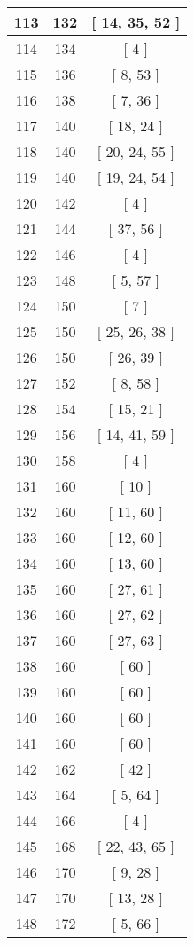 \begin{center}
\begin{longtable}[H]{|| c c c ||}
\\\hline
113 & 132 & [ 14, 35, 52 ]
\\\hline
114 & 134 & [ 4 ]
\\\hline
115 & 136 & [ 8, 53 ]
\\\hline
116 & 138 & [ 7, 36 ]
\\\hline
117 & 140 & [ 18, 24 ]
\\\hline
118 & 140 & [ 20, 24, 55 ]
\\\hline
119 & 140 & [ 19, 24, 54 ]
\\\hline
120 & 142 & [ 4 ]
\\\hline
121 & 144 & [ 37, 56 ]
\\\hline
122 & 146 & [ 4 ]
\\\hline
123 & 148 & [ 5, 57 ]
\\\hline
124 & 150 & [ 7 ]
\\\hline
125 & 150 & [ 25, 26, 38 ]
\\\hline
126 & 150 & [ 26, 39 ]
\\\hline
127 & 152 & [ 8, 58 ]
\\\hline
128 & 154 & [ 15, 21 ]
\\\hline
129 & 156 & [ 14, 41, 59 ]
\\\hline
130 & 158 & [ 4 ]
\\\hline
131 & 160 & [ 10 ]
\\\hline
132 & 160 & [ 11, 60 ]
\\\hline
133 & 160 & [ 12, 60 ]
\\\hline
134 & 160 & [ 13, 60 ]
\\\hline
135 & 160 & [ 27, 61 ]
\\\hline
136 & 160 & [ 27, 62 ]
\\\hline
137 & 160 & [ 27, 63 ]
\\\hline
138 & 160 & [ 60 ]
\\\hline
139 & 160 & [ 60 ]
\\\hline
140 & 160 & [ 60 ]
\\\hline
141 & 160 & [ 60 ]
\\\hline
142 & 162 & [ 42 ]
\\\hline
143 & 164 & [ 5, 64 ]
\\\hline
144 & 166 & [ 4 ]
\\\hline
145 & 168 & [ 22, 43, 65 ]
\\\hline
146 & 170 & [ 9, 28 ]
\\\hline
147 & 170 & [ 13, 28 ]
\\\hline
148 & 172 & [ 5, 66 ]
\\\hline

\end{longtable}
\end{center}
